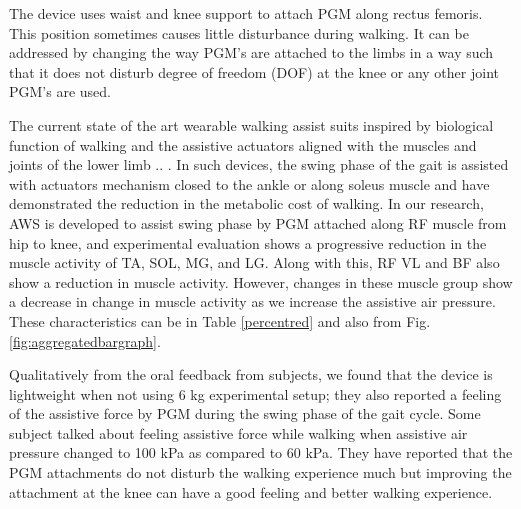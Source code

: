 \documentclass[letterpaper, 10 pt, conference]{ieeeconf}  %
\begin{document}
The device uses waist and knee support to attach PGM along rectus femoris. This position sometimes causes little disturbance during walking. It can be addressed by changing the way PGM’s are attached to the limbs in a way such that it does not disturb degree of freedom (DOF) at the knee or any other joint PGM’s are used. 

The current state of the art wearable walking assist suits inspired by biological function of walking and the assistive actuators aligned with the muscles and joints of the lower limb \cite{8} .. \cite{13}. In such devices, the swing phase of the gait is assisted with actuators mechanism closed to the ankle or along soleus muscle and have demonstrated the reduction in the metabolic cost of walking. In our research, AWS is developed to assist swing phase by PGM  attached along RF muscle from hip to knee, and experimental evaluation shows a progressive reduction in the muscle activity of TA, SOL, MG, and LG. Along with this, RF VL and BF also show a reduction in muscle activity. However, changes in these muscle group show a decrease in change in muscle activity as we increase the assistive air pressure. These characteristics can be in Table \ref{percentred} and also from Fig. \ref{fig:aggregatedbargraph}. 

Qualitatively from the oral feedback from subjects, we found that the device is lightweight when not using 6 kg experimental setup; they also reported a feeling of the assistive force by PGM during the swing phase of the gait cycle. Some subject talked about feeling assistive force while walking when assistive air pressure changed to 100 kPa as compared to 60 kPa. They have reported that the PGM attachments do not disturb the walking experience much but improving the attachment at the knee can have a good feeling and better walking experience. 
\end{document}

